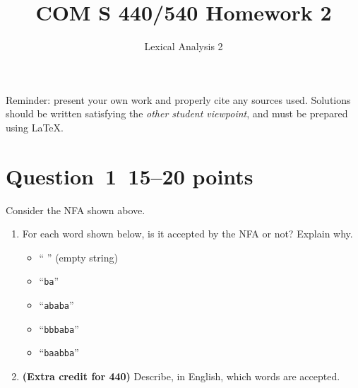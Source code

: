 \documentclass[10pt]{article}
\title{COM S 440/540 Homework 2}
\date{}
\author{Lexical Analysis 2}
\renewcommand{\thepage}{~}
\begin{document}
\maketitle

\noindent
Reminder: present your own work and properly cite any sources used.
Solutions should be written satisfying the \emph{other student viewpoint},
and must be prepared using \LaTeX.
\renewcommand{\thepage}{~}
 
\section*{Question~1~\hfill 15--20 points}

\begin{center}
\end{center}
Consider the NFA shown above.
\begin{enumerate}
\item
For each word shown below, is it accepted by the NFA or not?
Explain why.
\begin{itemize}
  \item `` '' (empty string)
  \item ``{\tt ba}''
  \item ``{\tt ababa}''
  \item ``{\tt bbbaba}''
  \item ``{\tt baabba}''
\end{itemize}

\item
{\bf (Extra credit for 440) }
Describe, in English, which words are accepted.
\end{enumerate}
\end{document}
